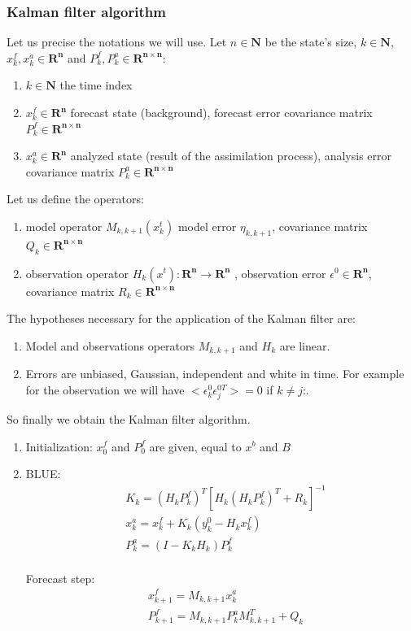 \subsubsection{Kalman filter algorithm}
Let us precise the notations we will use.
\newline
\noindent Let $n\in \mathbf{N}$ be the state's size, $k\in \mathbf{N}$, $x_k^f ,x_k^a\in \mathbf{R^n}$ and $P_k^f,P_k^a \in \mathbf{R^{n\times n}}$:
 \begin{enumerate}[label=\textbullet]
		\item $k\in \mathbf{N} $ the time index
		\item $x_{k}^{f}\in \mathbf{R^n}$ forecast state (background), forecast error covariance matrix $P_{k}^{f}\in \mathbf{R^{n\times n}}$
		\item $x_{k}^{a}\in \mathbf{R^n}$ analyzed state (result of the assimilation process), analysis error covariance matrix $P_{k}^{a}\in \mathbf{R^{n\times n}}$
	\end{enumerate}
\noindent Let us define the operators:
    \begin{enumerate}[label=\textbullet]
		\item model operator $ M_{k,k+1}(x_{k}^{t}) $ model error $\eta
		_{k,k+1}$, covariance matrix $Q_k\in \mathbf{R^{n\times n}}$
		\item observation operator $ H_k (x^t ): \mathbf{R^n} \rightarrow \mathbf{R^n} $ , observation error $\epsilon^0\in \mathbf{R^n}$, covariance matrix $R_k\in \mathbf{R^{n\times n}}$
	\end{enumerate}
\noindent The hypotheses necessary for the application of the Kalman filter are:
    \begin{enumerate}[label=\textbullet]
		\item Model and observations operators $M_{k,k+1}$ and $H_k$ are linear.
		\item Errors are unbiased, Gaussian, independent and white in time. For example for the observation we will have $<\epsilon_k^0\epsilon_j^{0T}>=0$ if $k\ne j$:.
	\end{enumerate}
So finally we obtain the Kalman filter algorithm.
\begin{enumerate}[label=(\roman*)]
\item Initialization: $x_0^f$ and $P_0^f$ are given, equal to $x^b$ and $B$
\item BLUE:
$$\begin{aligned} &K_k=(H_kP_k^f)^T[H_k(H_kP_k^f)^T+R_k]^{-1} \\
&x_k^a=x_k^f+K_k(y_k^0-H_kx_k^f) \\
&P_k^a=(I-K_kH_k)P_k^f \\
\end{aligned}$$

Forecast step:
$$\begin{aligned} 
&x_{k+1}^f=M_{k,k+1}x_k^a \\
&P_{k+1}^f=M_{k,k+1}P_k^aM_{k,k+1}^T+Q_k\\
\end{aligned}$$
\end{enumerate}

